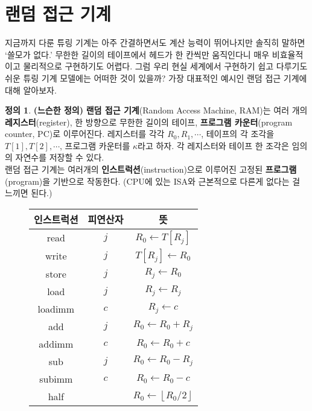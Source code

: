 \documentclass[b5paper, 10pt]{book}
\theoremstyle{definition}
\newtheorem{defn}{정의}[chapter]
\begin{document}
\section{랜덤 접근 기계}
지금까지 다룬 튜링 기계는 아주 간결하면서도 계산 능력이 뛰어나지만 솔직히 말하면 `쓸모가 없다.'
무한한 길이의 테이프에서 헤드가 한 칸씩만 움직인다니 매우 비효율적이고 
물리적으로 구현하기도 어렵다.
그럼 우리 현실 세계에서 구현하기 쉽고 다루기도 쉬운 튜링 기계 모델에는 어떠한 것이 있을까?
가장 대표적인 예시인 랜덤 접근 기계에 대해 알아보자.
\begin{defn} \label{ram definition}
    \textbf{(느슨한 정의)}
    \textbf{랜덤 접근 기계}(Random Access Machine, RAM)는 여러 개의 \textbf{레지스터}(register), 한 
    방향으로 무한한 길이의 테이프, \textbf{프로그램 카운터}(program counter, PC)로 이루어진다. 레지스터를 
    각각 $R_0, R_1, \cdots$, 
    테이프의 각 조각을 $T[1], T[2], \cdots $, 프로그램 카운터를 $\kappa$라고 하자. 
    각 레지스터와 테이프 한 조각은 임의의 자연수를 저장할 수 있다. \\ 
    랜덤 접근 기계는 여러개의 \textbf{인스트럭션}(instruction)으로 이루어진 고정된 \textbf{프로그램}(program)을
    기반으로 작동한다. (CPU에 있는 ISA와 근본적으로 다른게 없다는 걸 느끼면 된다.)
    \begin{figure}[!ht] 
        \centering
        \begin{tabular}{ ccc }
            인스트럭션 & 피연산자 & 뜻 \\ 
            \hline
            \hline
            read & $j$ & $R_0 \gets T[R_j]$ \\ 
            \hline
            write & $j$ & $T[R_j] \gets R_0$ \\ 
            \hline 
            store & $j$ & $R_j \gets R_0$ \\ 
            \hline 
            load & $j$ & $R_j \gets R_j$ \\ 
            \hline 
            loadimm & $c$ & $R_j \gets c$ \\ 
            \hline 
            add & $j$ & $R_0 \gets R_0 + R_j$ \\ 
            \hline 
            addimm & $c$ & $R_0 \gets R_0 + c$ \\ 
            \hline 
            sub & $j$ & $R_0 \gets R_0 - R_j$ \\ 
            \hline
            subimm & $c$ & $R_0 \gets R_0 - c$ \\ 
            \hline 
            half & & $R_0 \gets \left\lfloor R_0 / 2 \right\rfloor$ \\ 

\end{tabular}
\end{figure}
\end{defn}
\end{document}
